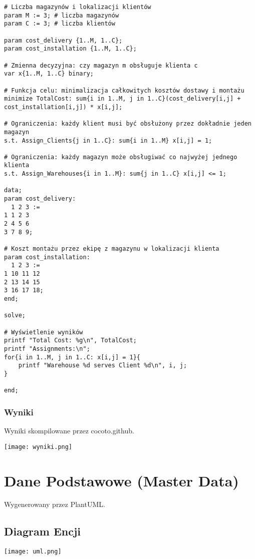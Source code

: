\begin{verbatim}
# Liczba magazynów i lokalizacji klientów
param M := 3; # liczba magazynów
param C := 3; # liczba klientów

param cost_delivery {1..M, 1..C};
param cost_installation {1..M, 1..C};

# Zmienna decyzyjna: czy magazyn m obsługuje klienta c
var x{1..M, 1..C} binary;

# Funkcja celu: minimalizacja całkowitych kosztów dostawy i montażu
minimize TotalCost: sum{i in 1..M, j in 1..C}(cost_delivery[i,j] + cost_installation[i,j]) * x[i,j];

# Ograniczenia: każdy klient musi być obsłużony przez dokładnie jeden magazyn
s.t. Assign_Clients{j in 1..C}: sum{i in 1..M} x[i,j] = 1;

# Ograniczenia: każdy magazyn może obsługiwać co najwyżej jednego klienta
s.t. Assign_Warehouses{i in 1..M}: sum{j in 1..C} x[i,j] <= 1;

data;
param cost_delivery:
  1 2 3 :=
1 1 2 3
2 4 5 6	
3 7 8 9;

# Koszt montażu przez ekipę z magazynu w lokalizacji klienta
param cost_installation:
  1 2 3 :=
1 10 11 12
2 13 14 15
3 16 17 18;
end;

solve;

# Wyświetlenie wyników
printf "Total Cost: %g\n", TotalCost;
printf "Assignments:\n";
for{i in 1..M, j in 1..C: x[i,j] = 1}{
    printf "Warehouse %d serves Client %d\n", i, j;
}

end;

\end{verbatim}

\subsubsection*{Wyniki}

Wyniki skompilowane przez cocoto.github\cite{glpk}.

\begin{center}
    \texttt{[image: wyniki.png]}\\[0.5cm]
\end{center}

\section{Dane Podstawowe (Master Data)}
Wygenerowany przez PlantUML\cite{plant}.
\subsection*{Diagram Encji}
\begin{center}
    \texttt{[image: uml.png]}\\[0.5cm]
\end{center}
